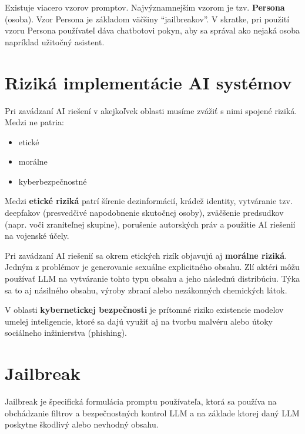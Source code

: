 Existuje viacero vzorov promptov. Najvýznamnejším vzorom je tzv. \textbf{Persona} (osoba). Vzor Persona je základom väčšiny ``jailbreakov''. V skratke, pri použití vzoru Persona používateľ dáva chatbotovi pokyn, aby sa správal ako nejaká osoba napríklad užitočný asistent.

\section*{Riziká implementácie AI systémov \label{sec:ai_risks_resume}}

Pri zavádzaní AI riešení v akejkoľvek oblasti musíme zvážiť s nimi spojené riziká. Medzi ne patria:

\begin{itemize}
    \item etické
    \item morálne
    \item kyberbezpečnostné
\end{itemize}

Medzi \textbf{etické riziká} patrí šírenie dezinformácií, krádež identity, vytváranie tzv. deepfakov (presvedčivé napodobnenie skutočnej osoby), zväčšenie predsudkov (napr. voči zraniteľnej skupine), porušenie autorských práv a použitie AI riešenií na vojenské účely.

Pri zavádzaní AI riešenií sa okrem etických rizík objavujú aj \textbf{morálne riziká}. Jedným z problémov je generovanie sexuálne explicitného obsahu. Zlí aktéri môžu používať LLM na vytváranie tohto typu obsahu a jeho následnú distribúciu. Týka sa to aj násilného obsahu, výroby zbraní alebo nezákonných chemických látok.

V oblasti \textbf{kybernetickej bezpečnosti} je prítomné riziko existencie modelov umelej inteligencie, ktoré sa dajú využiť aj na tvorbu malvéru alebo útoky sociálneho inžinierstva (phishing).


\section*{Jailbreak \label{sec:jailbreak_resume}}

Jailbreak je špecifická formulácia promptu používateľa, ktorá sa používa na obchádzanie filtrov a bezpečnostných kontrol LLM a na základe ktorej daný LLM poskytne škodlivý alebo nevhodný obsahu.

